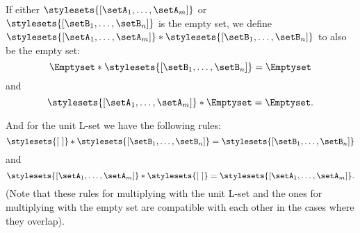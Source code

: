 If either $\stylesets{[\setA_1, \dots, \setA_m]}$ or $\stylesets{[\setB_1, \dots, \setB_n]}$ is the empty set, we define $\stylesets{[\setA_1, \dots, \setA_m]} * \stylesets{[\setB_1, \dots, \setB_n]}$ to also be the empty set:
\begin{equation}
    \Emptyset * \stylesets{[\setB_1, \dots, \setB_n]} = \Emptyset
\end{equation}
and
\begin{equation}
    \stylesets{[\setA_1, \dots, \setA_m]} * \Emptyset = \Emptyset.
\end{equation}

And for the unit L-set we have the following rules:
\begin{equation}
    \stylesets{[ \ ]} * \stylesets{[\setB_1, \dots, \setB_n]} = \stylesets{[\setB_1,  \dots, \setB_n]}
\end{equation}
and
\begin{equation}
    \stylesets{[\setA_1, \dots, \setA_m]} * \stylesets{[ \ ]} = \stylesets{[\setA_1, \dots, \setA_m]}.
\end{equation}
(Note that these rules for multiplying with the unit L-set and the ones for multiplying with the empty set are compatible with each other in the cases where they overlap).

